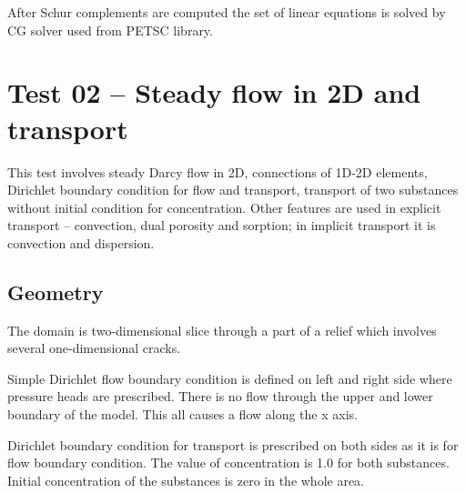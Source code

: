 After Schur complements are computed the set of linear equations is solved by CG solver used from PETSC library.






\section{Test 02 -- Steady flow in 2D and transport}
\label{sec:test02}
This test involves steady Darcy flow in 2D, connections of 1D-2D elements, Dirichlet boundary condition for flow and transport, transport of two substances without initial condition for concentration. Other features are used in explicit transport -- convection, dual porosity and sorption; in implicit transport it is convection and dispersion.

\subsection*{Geometry}
The domain is two-dimensional slice through a part of a relief which involves several one-dimensional cracks.

Simple Dirichlet flow boundary condition is defined on left and right side where pressure heads are prescribed. There is no flow through the upper and lower boundary of the model. This all causes a flow along the x axis.

Dirichlet boundary condition for transport is prescribed on both sides as it is for flow boundary condition. The value of concentration is 1.0 for both substances. Initial concentration of the substances is zero in the whole area. 

